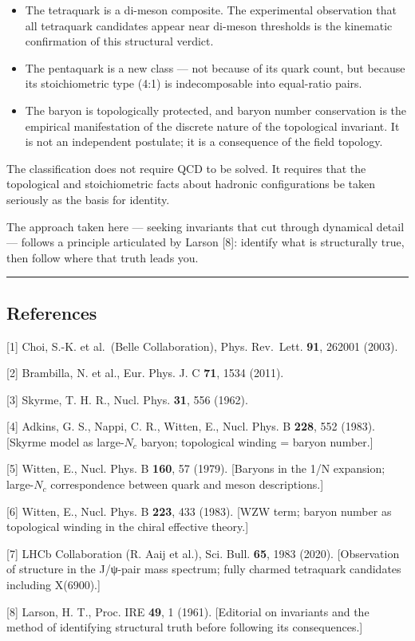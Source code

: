 \documentclass[12pt,a4paper]{article}
\begin{document}
\begin{itemize}
\item
  The tetraquark is a di-meson composite. The experimental observation
  that all tetraquark candidates appear near di-meson thresholds is the
  kinematic confirmation of this structural verdict.
\item
  The pentaquark is a new class --- not because of its quark
  count, but because its stoichiometric type (4:1) is indecomposable
  into equal-ratio pairs.
\item
  The baryon is topologically protected, and baryon number conservation
  is the empirical manifestation of the discrete nature of the
  topological invariant. It is not an independent postulate; it is a
  consequence of the field topology.
\end{itemize}

The classification does not require QCD to be solved. It requires that
the topological and stoichiometric facts about hadronic configurations
be taken seriously as the basis for identity.

The approach taken here --- seeking invariants that cut through
dynamical detail --- follows a principle articulated by Larson {[}8{]}:
identify what is structurally true, then follow where that truth leads
you.

\begin{center}\rule{0.5\linewidth}{0.5pt}\end{center}

\hypertarget{references}{%
\subsection*{References}\label{references}}

{[}1{]} Choi, S.-K. et al.~(Belle Collaboration), Phys. Rev.~Lett.
\textbf{91}, 262001 (2003).

{[}2{]} Brambilla, N. et al., Eur. Phys. J. C \textbf{71}, 1534 (2011).

{[}3{]} Skyrme, T. H. R., Nucl. Phys. \textbf{31}, 556 (1962).

{[}4{]} Adkins, G. S., Nappi, C. R., Witten, E., Nucl. Phys. B
\textbf{228}, 552 (1983). {[}Skyrme model as large-\(N_c\) baryon;
topological winding = baryon number.{]}

{[}5{]} Witten, E., Nucl. Phys. B \textbf{160}, 57 (1979). {[}Baryons in
the 1/N expansion; large-\(N_c\) correspondence between quark and meson
descriptions.{]}

{[}6{]} Witten, E., Nucl. Phys. B \textbf{223}, 433 (1983). {[}WZW term;
baryon number as topological winding in the chiral effective theory.{]}

{[}7{]} LHCb Collaboration (R. Aaij et al.), Sci. Bull. \textbf{65},
1983 (2020). {[}Observation of structure in the J/ψ-pair mass spectrum;
fully charmed tetraquark candidates including X(6900).{]}

{[}8{]} Larson, H. T., Proc. IRE \textbf{49}, 1 (1961). {[}Editorial on
invariants and the method of identifying structural truth
before following its consequences.{]}
\end{document}
